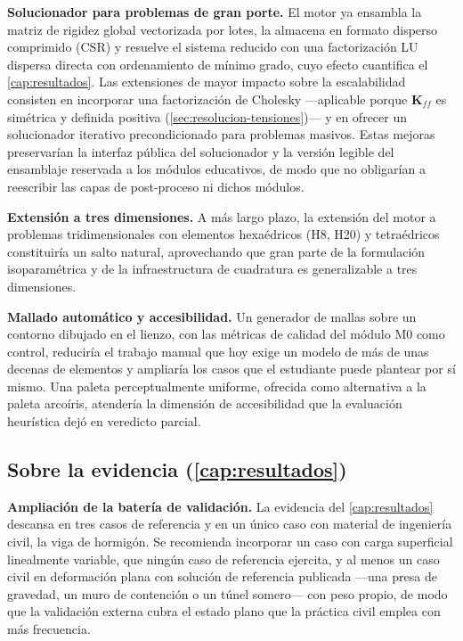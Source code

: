 \textbf{Solucionador para problemas de gran porte.} El motor ya ensambla la matriz de rigidez global vectorizada por lotes, la almacena en formato disperso comprimido (CSR) y resuelve el sistema reducido con una factorización LU dispersa directa con ordenamiento de mínimo grado, cuyo efecto cuantifica el \autoref{cap:resultados}. Las extensiones de mayor impacto sobre la escalabilidad consisten en incorporar una factorización de Cholesky —aplicable porque $\bm{K}_{ff}$ es simétrica y definida positiva (\autoref{sec:resolucion-tensiones})— y en ofrecer un solucionador iterativo precondicionado para problemas masivos. Estas mejoras preservarían la interfaz pública del solucionador y la versión legible del ensamblaje reservada a los módulos educativos, de modo que no obligarían a reescribir las capas de post-proceso ni dichos módulos.

\textbf{Extensión a tres dimensiones.} A más largo plazo, la extensión del motor a problemas tridimensionales con elementos hexaédricos (H8, H20) y tetraédricos constituiría un salto natural, aprovechando que gran parte de la formulación isoparamétrica y de la infraestructura de cuadratura es generalizable a tres dimensiones.

\textbf{Mallado automático y accesibilidad.} Un generador de mallas sobre un contorno dibujado en el lienzo, con las métricas de calidad del módulo M0 como control, reduciría el trabajo manual que hoy exige un modelo de más de unas decenas de elementos y ampliaría los casos que el estudiante puede plantear por sí mismo. Una paleta perceptualmente uniforme, ofrecida como alternativa a la paleta arcoíris, atendería la dimensión de accesibilidad que la evaluación heurística dejó en veredicto parcial.

\subsection*{Sobre la evidencia (\autoref{cap:resultados})}

\textbf{Ampliación de la batería de validación.} La evidencia del \autoref{cap:resultados} descansa en tres casos de referencia y en un único caso con material de ingeniería civil, la viga de hormigón. Se recomienda incorporar un caso con carga superficial linealmente variable, que ningún caso de referencia ejercita, y al menos un caso civil en deformación plana con solución de referencia publicada —una presa de gravedad, un muro de contención o un túnel somero— con peso propio, de modo que la validación externa cubra el estado plano que la práctica civil emplea con más frecuencia.

